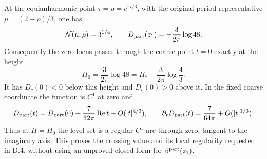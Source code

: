 \begin{proposition}[D.4.5; Proved]
At the equianharmonic point \(\tau=\rho=e^{\pi i/3}\), with the
original period representative \(\mu=(2-\rho)/3\), one has
\[
 \mathcal N(\mu,\rho)=3^{1/4},\qquad
 D_{\rm part}(z_1)=-\frac3{2\pi}\log48.
\]
Consequently the zero locus passes through the coarse point \(t=0\)
exactly at the height
\[
 H_0=\frac3{2\pi}\log48
 =H_*+\frac3{2\pi}\log\frac43.
\]
It has \(D_c(0)<0\) below this height and \(D_c(0)>0\) above it.
In the fixed coarse coordinate the function is \(C^1\) at zero and
\[
 D_{\rm part}(t)=D_{\rm part}(0)
       +\frac7{32\pi}\operatorname{Re}t+O(|t|^{4/3}),\qquad
 \partial_tD_{\rm part}(t)=\frac7{64\pi}+O(|t|^{1/3}).
\]
Thus at \(H=H_0\) the level set is a regular \(C^1\) arc through
zero, tangent to the imaginary axis. This proves the crossing value
and its local regularity requested in D.4, without using an unproved
closed form for \(\beta^{\rm part}(z_1)\).
\end{proposition}

